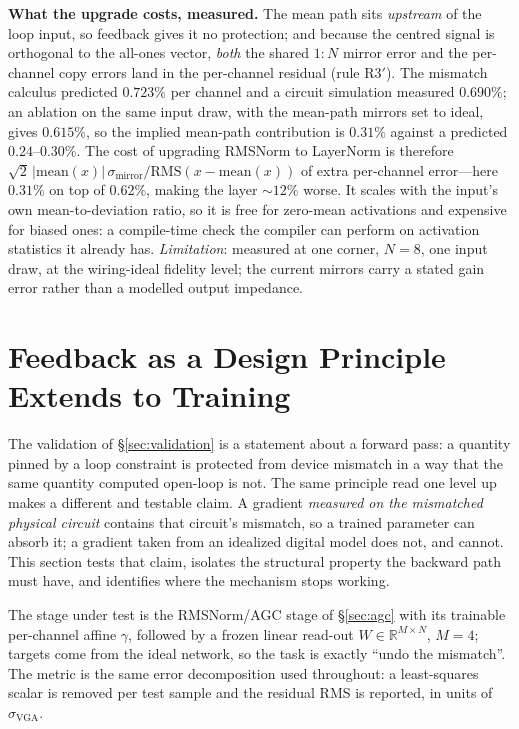 \documentclass[11pt]{article}
\begin{document}
\textbf{What the upgrade costs, measured.} The mean path sits \textit{upstream} of the loop input, so feedback gives it no protection; and because the centred signal is orthogonal to the all-ones vector, \textit{both} the shared $1{:}N$ mirror error and the per-channel copy errors land in the per-channel residual (rule R3$'$). The mismatch calculus predicted $0.723\%$ per channel and a circuit simulation measured $0.690\%$; an ablation on the same input draw, with the mean-path mirrors set to ideal, gives $0.615\%$, so the implied mean-path contribution is $\mathbf{0.31\%}$ against a predicted $0.24$--$0.30\%$. The cost of upgrading RMSNorm to LayerNorm is therefore $\sqrt2\,|\mathrm{mean}(x)|\,\sigma_{\mathrm{mirror}}/\mathrm{RMS}(x-\mathrm{mean}(x))$ of extra per-channel error---here $0.31\%$ on top of $0.62\%$, making the layer ${\sim}12\%$ worse. It scales with the input's own mean-to-deviation ratio, so it is free for zero-mean activations and expensive for biased ones: a compile-time check the compiler can perform on activation statistics it already has. \textit{Limitation}: measured at one corner, $N=8$, one input draw, at the wiring-ideal fidelity level; the current mirrors carry a stated gain error rather than a modelled output impedance.

\section{Feedback as a Design Principle Extends to Training}
\label{sec:training}

The validation of \S\ref{sec:validation} is a statement about a forward pass: a quantity pinned by a loop constraint is protected from device mismatch in a way that the same quantity computed open-loop is not. The same principle read one level up makes a different and testable claim. A gradient \textit{measured on the mismatched physical circuit} contains that circuit's mismatch, so a trained parameter can absorb it; a gradient taken from an idealized digital model does not, and cannot. This section tests that claim, isolates the structural property the backward path must have, and identifies where the mechanism stops working.

The stage under test is the RMSNorm/AGC stage of \S\ref{sec:agc} with its trainable per-channel affine $\gamma$, followed by a frozen linear read-out $W \in \mathbb{R}^{M\times N}$, $M=4$; targets come from the ideal network, so the task is exactly ``undo the mismatch''. The metric is the same error decomposition used throughout: a least-squares scalar is removed per test sample and the residual RMS is reported, in units of $\sigma_{\mathrm{VGA}}$.
\end{document}
